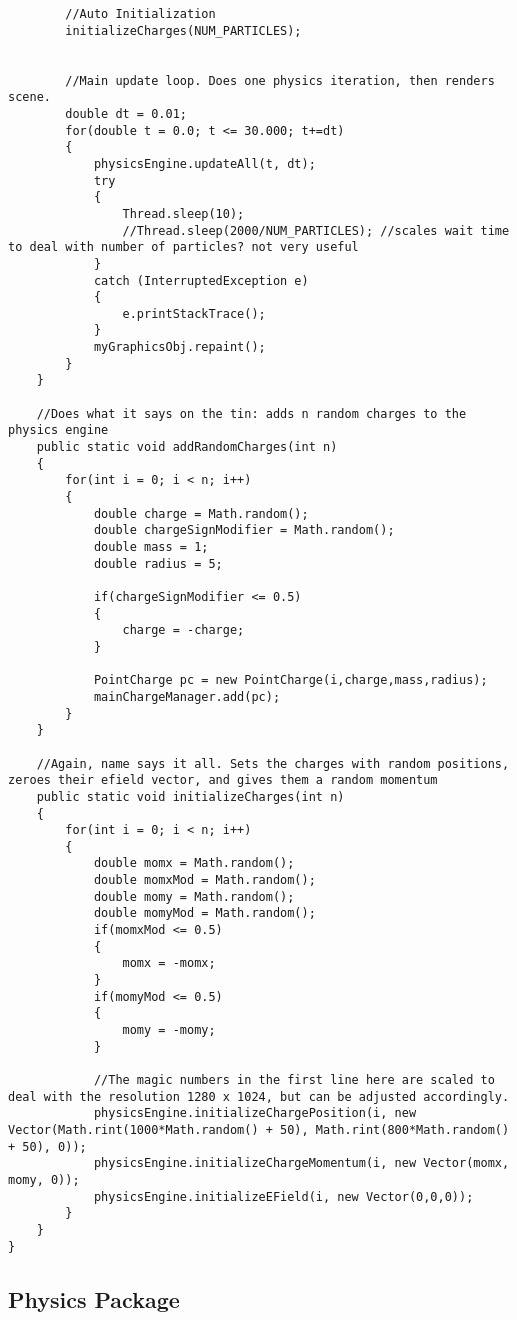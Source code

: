\documentclass[10pt]{article}
\begin{document}
\begin{verbatim}
		//Auto Initialization
		initializeCharges(NUM_PARTICLES);
				
		
		//Main update loop. Does one physics iteration, then renders scene.
		double dt = 0.01;
		for(double t = 0.0; t <= 30.000; t+=dt)
		{
			physicsEngine.updateAll(t, dt);
			try 
			{
				Thread.sleep(10);
				//Thread.sleep(2000/NUM_PARTICLES); //scales wait time to deal with number of particles? not very useful
			} 
			catch (InterruptedException e) 
			{
				e.printStackTrace();
			}
			myGraphicsObj.repaint();
		}
	}
	
	//Does what it says on the tin: adds n random charges to the physics engine
	public static void addRandomCharges(int n)
	{
		for(int i = 0; i < n; i++)
		{
			double charge = Math.random();
			double chargeSignModifier = Math.random();
			double mass = 1;
			double radius = 5;
			
			if(chargeSignModifier <= 0.5)
			{
				charge = -charge;
			}
			
			PointCharge pc = new PointCharge(i,charge,mass,radius);
			mainChargeManager.add(pc);
		}
	}
	
	//Again, name says it all. Sets the charges with random positions, zeroes their efield vector, and gives them a random momentum
	public static void initializeCharges(int n)
	{
		for(int i = 0; i < n; i++)
		{
			double momx = Math.random();
			double momxMod = Math.random();
			double momy = Math.random();
			double momyMod = Math.random();
			if(momxMod <= 0.5)
			{
				momx = -momx;
			}
			if(momyMod <= 0.5)
			{
				momy = -momy;
			}
				
			//The magic numbers in the first line here are scaled to deal with the resolution 1280 x 1024, but can be adjusted accordingly.
			physicsEngine.initializeChargePosition(i, new Vector(Math.rint(1000*Math.random() + 50), Math.rint(800*Math.random() + 50), 0));
			physicsEngine.initializeChargeMomentum(i, new Vector(momx, momy, 0));
			physicsEngine.initializeEField(i, new Vector(0,0,0));
		}
	}
}

\end{verbatim}
\subsection{Physics Package}
\end{document}
